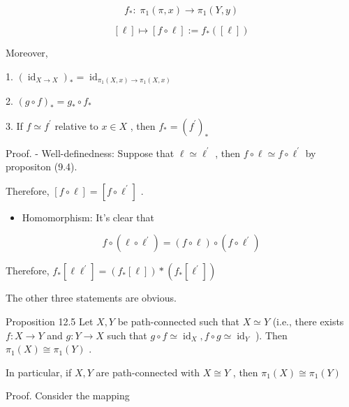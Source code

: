 \[
{f}_{ * } : \;{\pi }_{1}\left( {\pi ,x}\right)  \rightarrow  {\pi }_{1}\left( {Y,y}\right)
\]

\[
\left\lbrack  \ell \right\rbrack   \mapsto  \left\lbrack  {f \circ  \ell }\right\rbrack   \mathrel{\text{ := }} {f}_{ * }\left( \left\lbrack  \ell \right\rbrack  \right)
\]

Moreover,

1. \({\left( {\operatorname{id}}_{X \rightarrow  X}\right) }_{ * } = {\operatorname{id}}_{{\pi }_{1}\left( {X,x}\right)  \rightarrow  {\pi }_{1}\left( {X,x}\right) }\)

2. \({\left( g \circ  f\right) }_{ * } = {g}_{ * } \circ  {f}_{ * }\)

3. If \(f \simeq  {f}^{\prime }\) relative to \(x \in  X\) , then \({f}_{ * } = {\left( {f}^{\prime }\right) }_{ * }\)

Proof. - Well-definedness: Suppose that \(\ell  \simeq  {\ell }^{\prime }\) , then \(f \circ  \ell  \simeq  f \circ  {\ell }^{\prime }\) by propositon (9.4).

Therefore, \(\left\lbrack  {f \circ  \ell }\right\rbrack   = \left\lbrack  {f \circ  {\ell }^{\prime }}\right\rbrack\) .

\begin{itemize}
\item Homomorphism: It's clear that
\end{itemize}

\[
f \circ  \left( {\ell  \circ  {\ell }^{\prime }}\right)  = \left( {f \circ  \ell }\right)  \circ  \left( {f \circ  {\ell }^{\prime }}\right)
\]

Therefore, \({f}_{ * }\left\lbrack  {\ell {\ell }^{\prime }}\right\rbrack   = \left( {{f}_{ * }\left\lbrack  \ell \right\rbrack  }\right)  * \left( {{f}_{ * }\left\lbrack  {\ell }^{\prime }\right\rbrack  }\right)\)

The other three statements are obvious.

Proposition 12.5 Let \(X,Y\) be path-connected such that \(X \simeq  Y\) (i.e., there exists \(f : X \rightarrow  Y\) and \(g : Y \rightarrow  X\) such that \(g \circ  f \simeq  {\operatorname{id}}_{X},f \circ  g \simeq  {\operatorname{id}}_{Y}\) ). Then \({\pi }_{1}\left( X\right)  \cong  {\pi }_{1}\left( Y\right)\) .

In particular, if \(X,Y\) are path-connected with \(X \cong  Y\) , then \({\pi }_{1}\left( X\right)  \cong  {\pi }_{1}\left( Y\right)\)

Proof. Consider the mapping

